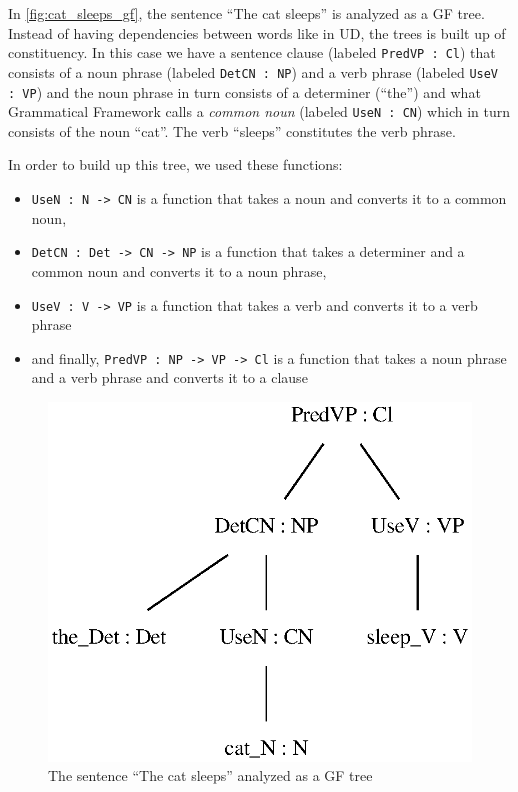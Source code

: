 In \autoref{fig:cat_sleeps_gf}, the sentence ``The cat sleeps'' is analyzed as a GF tree. Instead of having dependencies between words like in UD, the trees is built up of constituency. In this case we have a sentence clause (labeled \verb|PredVP : Cl|) that consists of a noun phrase (labeled \verb|DetCN : NP|) and a verb phrase (labeled \verb|UseV : VP|) and the noun phrase in turn consists of a determiner (``the'') and what Grammatical Framework calls a \emph{common noun} (labeled \verb|UseN : CN|) which in turn consists of the noun ``cat''. The verb ``sleeps'' constitutes the verb phrase.

In order to build up this tree, we used these functions:
\begin{itemize}
    \item  \verb|UseN : N -> CN| is a function that takes a noun and converts it to a common noun,
    \item \verb|DetCN : Det -> CN -> NP| is a function that takes a determiner and a common noun and converts it to a noun phrase,
    \item \verb|UseV : V -> VP| is a function that takes a verb and converts it to a verb phrase
    \item and finally, \verb|PredVP : NP -> VP -> Cl| is a function that takes a noun phrase and a verb phrase and converts it to a clause
\end{itemize}

\begin{figure}[htb]
  \centering
  \includegraphics[width=0.5\linewidth]{figure/cat_sleeps_cl.eps}
  \caption{The sentence ``The cat sleeps'' analyzed as a GF tree}
  \label{fig:cat_sleeps_gf}
\end{figure}


%

